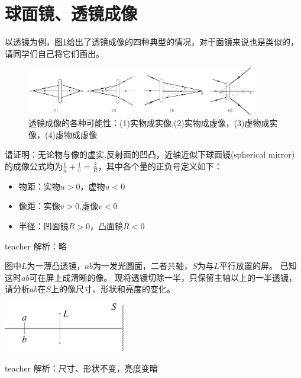 \section{球面镜、透镜成像}
以透镜为例，图\ref{fig: geo-lense-various-case}给出了透镜成像的四种典型的情况，对于面镜来说也是类似的，请同学们自己将它们画出。
\begin{figure}
\begin{center}
\includegraphics[width=0.9\textwidth]{images/lense-various-case.pdf}
\caption{透镜成像的各种可能性：(1)实物成实像,(2)实物成虚像，(3)虚物成实像，(4)虚物成虚像}
\label{fig: geo-lense-various-case}
\end{center}
\end{figure}



\begin{example}
请证明：无论物与像的虚实,反射面的凹凸，近轴近似下{\heiti 球面镜}(spherical mirror)的成像公式均为$\frac{1}{u}+\frac{1}{v}=\frac{2}{R}$，其中各个量的正负号定义如下：
\begin{itemize}
\item 物距：实物$u>0$，虚物$u<0$
\item 像距：实像$v>0$,虚像$v<0$
\item 半径：凹面镜$R>0$，凸面镜$R<0$
\end{itemize}

\begin{taggedblock}{teacher}
\noindent
解析：略
\end{taggedblock}
\end{example}



\begin{example}
	图中$L$为一薄凸透镜，$ab$为一发光圆面，二者共轴，$S$为与$L$平行放置的屏。
	已知这时$ab$可在屏上成清晰的像。
	现将透镜切除一半，只保留主轴以上的一半透镜，请分析$ab$在$S$上的像尺寸、形状和亮度的变化。
		\begin{flushright}
			\includegraphics[width = 0.4\textwidth]{images/opt-18.pdf} 
		\end{flushright}
	\begin{taggedblock}{teacher}
		\noindent
		解析：尺寸、形状不变，亮度变暗
	\end{taggedblock}
\end{example}

